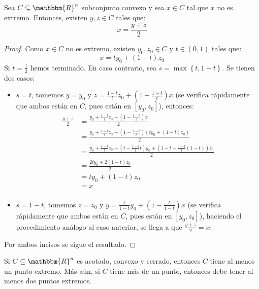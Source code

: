 \documentclass[12pt]{report}
\theoremstyle{largebreak}
\newcommand{\bbm}[1]{\ensuremath{\mathbbm{#1}}}
\begin{document}
\begin{lema}
    Sea $C\subseteq\bbm{R}^n$ subconjunto convexo y sea $x\in C$ tal que $x$ no es extremo. Entonces, existen $y,z\in C$ tales que:
    \begin{equation*}
        x=\frac{y+z}{2}
    \end{equation*}
\end{lema}

\begin{proof}
    Como $x\in C$ no es extremo, existen $y_0,z_0\in C$ y $t\in(0,1)$ tales que:
    \begin{equation*}
        x=ty_0+(1-t)z_0
    \end{equation*}
    Si $t=\frac{1}{2}$ hemos terminado. En caso contrario, sea $s=\max\left\{t,1-t\right\}$. Se tienen dos casos:
    \begin{itemize}
        \item $s=t$, tomemos $y=y_0$ y $z=\frac{1-t}{t}z_0+\left(1-\frac{1-t}{t}\right)x$ (se verifica rápidamente que ambos están en $C$, pues están en $[y_0,z_0]$), entonces:
        \begin{equation*}
            \begin{split}
                \frac{y+z}{2}&=\frac{y_0+\frac{1-t}{t}z_0+\left(1-\frac{1-t}{t}\right)x}{2}\\
                &=\frac{y_0+\frac{1-t}{t}z_0+\left(1-\frac{1-t}{t}\right)(ty_0+(1-t)z_0)}{2}\\
                &=\frac{y_0+\frac{1-t}{t}z_0+\left(t-\frac{1-t}{t}t\right)y_0+\left(1-t-\frac{1-t}{t}(1-t)\right)z_0}{2}\\
                &=\frac{2ty_0+2(1-t)z_0}{2}\\
                &=ty_0+(1-t)z_0\\
                &=x\\
            \end{split}
        \end{equation*}
        \item $s=1-t$, tomemos $z=z_0$ y $y=\frac{t}{1-t}y_0+\left(1-\frac{t}{1-t}\right)x$ (se verifica rápidamente que ambos están en $C$, pues están en $[y_0,z_0]$), haciendo el procedimiento análogo al caso anterior, se llega a que $\frac{y+z}{2}=x$.
    \end{itemize}
    Por ambos incisos se sigue el resultado.
\end{proof}

\begin{theor}
    Si $C\subseteq\bbm{R}^n$ es acotado, convexo y cerrado, entonces $C$ tiene al menos un punto extremo. Más aún, si $C$ tiene más de un punto, entonces debe tener al menos dos puntos extremos.
\end{theor}
\end{document}
